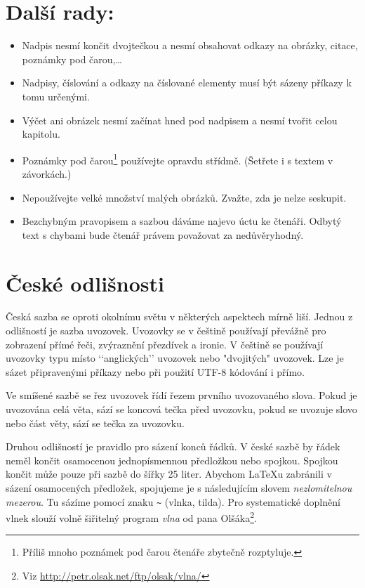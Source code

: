 \documentclass[10pt, a4paper, twocolumn]{article}
\begin{document}
\section{Další rady:}
\label{sec:Další rady:}
\begin{itemize}
\item{Nadpis nesmí končit dvojtečkou a nesmí obsahovat odkazy na obrázky, citace, poznámky pod čarou,\dots}

\item{Nadpisy, číslování a odkazy na číslované elementy musí být sázeny příkazy k tomu určenými.}

\item{Výčet ani obrázek nesmí začínat hned pod nadpisem a nesmí tvořit celou kapitolu.}

\item{Poznámky pod čarou\footnote{Příliš mnoho poznámek pod čarou čtenáře zbytečně rozptyluje.} používejte opravdu střídmě. (Šetřete i s textem v závorkách.)}

\item{Nepoužívejte velké množství malých obrázků. Zvažte, zda je nelze seskupit.}

\item{Bezchybným pravopisem a sazbou dáváme najevo úctu ke čtenáři. Odbytý text s chybami bude čtenář právem považovat za nedůvěryhodný.}
\end{itemize}

\section{České odlišnosti}
Česká sazba se oproti okolnímu světu v některých aspektech mírně liší. Jednou z odlišností je sazba uvozovek. Uvozovky se v češtině používají převážně pro zobrazení přímé řeči, zvýraznění přezdívek a ironie. V češtině se používají uvozovky typu  místo ‘‘anglických’’ uvozovek nebo "dvojitých" uvozovek. Lze je sázet připravenými příkazy nebo při použití UTF-8 kódování i přímo.

Ve smíšené sazbě se řez uvozovek řídí řezem prvního uvozovaného slova. Pokud je uvozována celá věta, sází se koncová tečka před uvozovku, pokud se uvozuje slovo nebo část věty, sází se tečka za uvozovku.

Druhou odlišností je pravidlo pro sázení konců řádků. V české sazbě by řádek neměl končit osamocenou jednopísmennou předložkou nebo spojkou. Spojkou  končit může pouze při sazbě do šířky 25 liter. Abychom \LaTeX u zabránili v sázení osamocených předložek, spojujeme je s následujícím slovem \emph{nezlomitelnou mezerou}. Tu sázíme pomocí znaku \texttt{\textasciitilde} (vlnka, tilda). Pro systematické doplnění vlnek slouží volně šiřitelný program \emph{vlna} od pana Olšáka\footnote{Viz \url{http://petr.olsak.net/ftp/olsak/vlna/}}.
\end{document}
